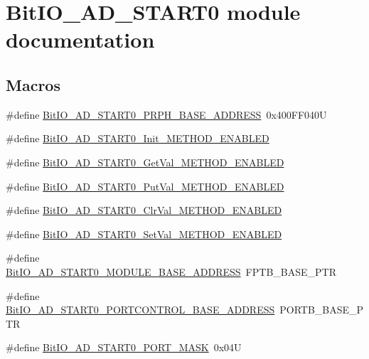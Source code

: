 \hypertarget{group___bit_i_o___a_d___s_t_a_r_t0__module}{\section{Bit\-I\-O\-\_\-\-A\-D\-\_\-\-S\-T\-A\-R\-T0 module documentation}
\label{group___bit_i_o___a_d___s_t_a_r_t0__module}
}
\subsection*{Macros}
\begin{DoxyCompactItemize}
\item 
\#define \hyperlink{group___bit_i_o___a_d___s_t_a_r_t0__module_gacc2fbe916fb893f5c5bb4eaa1f46312f}{Bit\-I\-O\-\_\-\-A\-D\-\_\-\-S\-T\-A\-R\-T0\-\_\-\-P\-R\-P\-H\-\_\-\-B\-A\-S\-E\-\_\-\-A\-D\-D\-R\-E\-S\-S}~0x400\-F\-F040\-U
\item 
\#define \hyperlink{group___bit_i_o___a_d___s_t_a_r_t0__module_ga12fbcf838baba41d1980cf48f6b60c52}{Bit\-I\-O\-\_\-\-A\-D\-\_\-\-S\-T\-A\-R\-T0\-\_\-\-Init\-\_\-\-M\-E\-T\-H\-O\-D\-\_\-\-E\-N\-A\-B\-L\-E\-D}
\item 
\#define \hyperlink{group___bit_i_o___a_d___s_t_a_r_t0__module_gad0145e614883f1840c077b6218d90d82}{Bit\-I\-O\-\_\-\-A\-D\-\_\-\-S\-T\-A\-R\-T0\-\_\-\-Get\-Val\-\_\-\-M\-E\-T\-H\-O\-D\-\_\-\-E\-N\-A\-B\-L\-E\-D}
\item 
\#define \hyperlink{group___bit_i_o___a_d___s_t_a_r_t0__module_gaa2cfdc9631e154c111f41786a54c8359}{Bit\-I\-O\-\_\-\-A\-D\-\_\-\-S\-T\-A\-R\-T0\-\_\-\-Put\-Val\-\_\-\-M\-E\-T\-H\-O\-D\-\_\-\-E\-N\-A\-B\-L\-E\-D}
\item 
\#define \hyperlink{group___bit_i_o___a_d___s_t_a_r_t0__module_ga5a61b4834dd1609c3934b751384e3b1a}{Bit\-I\-O\-\_\-\-A\-D\-\_\-\-S\-T\-A\-R\-T0\-\_\-\-Clr\-Val\-\_\-\-M\-E\-T\-H\-O\-D\-\_\-\-E\-N\-A\-B\-L\-E\-D}
\item 
\#define \hyperlink{group___bit_i_o___a_d___s_t_a_r_t0__module_ga34cf0369791c3bbe5392c3671442a2d9}{Bit\-I\-O\-\_\-\-A\-D\-\_\-\-S\-T\-A\-R\-T0\-\_\-\-Set\-Val\-\_\-\-M\-E\-T\-H\-O\-D\-\_\-\-E\-N\-A\-B\-L\-E\-D}
\item 
\#define \hyperlink{group___bit_i_o___a_d___s_t_a_r_t0__module_ga83201243a6d952893a023c5c44ab9aaa}{Bit\-I\-O\-\_\-\-A\-D\-\_\-\-S\-T\-A\-R\-T0\-\_\-\-M\-O\-D\-U\-L\-E\-\_\-\-B\-A\-S\-E\-\_\-\-A\-D\-D\-R\-E\-S\-S}~F\-P\-T\-B\-\_\-\-B\-A\-S\-E\-\_\-\-P\-T\-R
\item 
\#define \hyperlink{group___bit_i_o___a_d___s_t_a_r_t0__module_ga0ab10ea55da341c0c6e1dd7d8cbfb33f}{Bit\-I\-O\-\_\-\-A\-D\-\_\-\-S\-T\-A\-R\-T0\-\_\-\-P\-O\-R\-T\-C\-O\-N\-T\-R\-O\-L\-\_\-\-B\-A\-S\-E\-\_\-\-A\-D\-D\-R\-E\-S\-S}~P\-O\-R\-T\-B\-\_\-\-B\-A\-S\-E\-\_\-\-P\-T\-R
\item 
\#define \hyperlink{group___bit_i_o___a_d___s_t_a_r_t0__module_gaf433b52d6e580ceb8f67337a26b501ba}{Bit\-I\-O\-\_\-\-A\-D\-\_\-\-S\-T\-A\-R\-T0\-\_\-\-P\-O\-R\-T\-\_\-\-M\-A\-S\-K}~0x04\-U
\end{DoxyCompactItemize}
